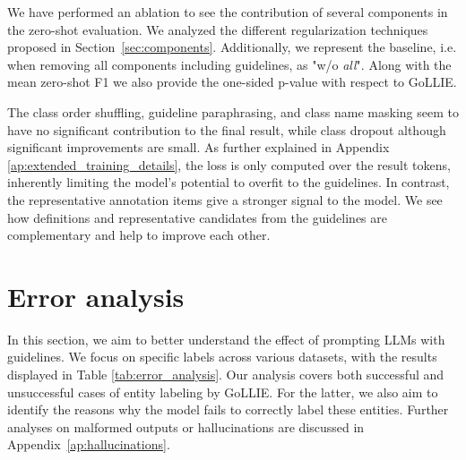 We have performed an ablation to see the contribution of several components in the zero-shot evaluation. We analyzed the different regularization techniques proposed in Section~\ref{sec:components}. Additionally, we represent the baseline, i.e. when removing all components including guidelines, as "w/o \textit{all}".
Along with the mean zero-shot F1 we also provide the one-sided p-value with respect to \GoLLIE GoLLIE. 

The class order shuffling, guideline paraphrasing, and class name masking seem to have no significant contribution to the final result, while class dropout although significant improvements are small. As further explained in Appendix \ref{ap:extended_training_details}, the loss is only computed over the result tokens, inherently limiting the model's potential to overfit to the guidelines. In contrast, the representative annotation items give a stronger signal to the model. We see how definitions and representative candidates from the guidelines are complementary and help to improve each other. 

\section{Error analysis} 

In this section, we aim to better understand the effect of prompting LLMs with guidelines. We focus on specific labels across various datasets, with the results displayed in Table \ref{tab:error_analysis}. Our analysis covers both successful and unsuccessful cases of entity labeling by GoLLIE. For the latter, we also aim to identify the reasons why the model fails to correctly label these entities. Further analyses on malformed outputs or hallucinations are discussed in Appendix~\ref{ap:hallucinations}.

